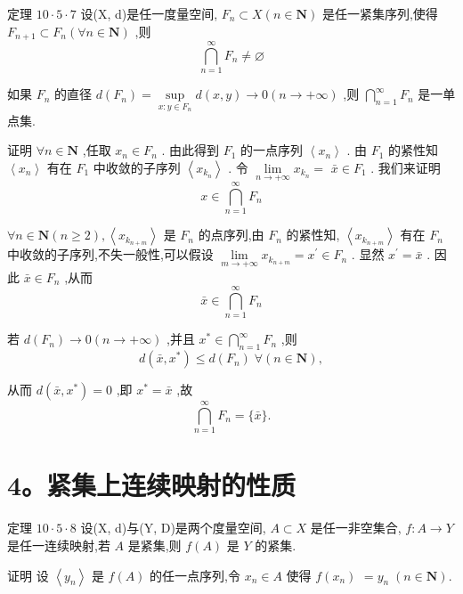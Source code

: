 定理 ${10} \cdot  5 \cdot  7$ 设(X, d)是任一度量空间, ${F}_{n} \subset  X\left( {n \in  \mathbf{N}}\right)$ 是任一紧集序列,使得 ${F}_{n + 1} \subset  {F}_{n}\left( {\forall n \in  \mathbf{N}}\right)$ ,则
$$\mathop{\bigcap }\limits_{{n = 1}}^{\infty }{F}_{n} \neq  \varnothing$$

如果 ${F}_{n}$ 的直径 $d\left( {F}_{n}\right)  = \mathop{\sup }\limits_{{x : y \in  {F}_{n}}}d\left( {x,y}\right)  \rightarrow  0\left( {n \rightarrow   + \infty }\right)$ ,则 $\mathop{\bigcap }\limits_{{n = 1}}^{\infty }{F}_{n}$ 是一单点集.

证明 $\forall n \in  \mathbf{N}$ ,任取 ${x}_{n} \in  {F}_{n}$ . 由此得到 ${F}_{1}$ 的一点序列 $\left\langle  {x}_{n}\right\rangle$ . 由 ${F}_{1}$ 的紧性知 $\left\langle  {x}_{n}\right\rangle$ 有在 ${F}_{1}$ 中收敛的子序列 $\left\langle  {x}_{{k}_{n}}\right\rangle$ . 令 $\mathop{\lim }\limits_{{n \rightarrow   + \infty }}{x}_{{k}_{n}} =$  $\bar{x} \in  {F}_{1}$ . 我们来证明
$$x \in  \mathop{\bigcap }\limits_{{n = 1}}^{\infty }{F}_{n}$$

$\forall n \in  \mathbf{N}\left( {n \geq  2}\right) ,\left\langle  {x}_{{k}_{n + m}}\right\rangle$ 是 ${F}_{n}$ 的点序列,由 ${F}_{n}$ 的紧性知, $\left\langle  {x}_{{k}_{n + m}}\right\rangle$ 有在 ${F}_{n}$ 中收敛的子序列,不失一般性,可以假设 $\mathop{\lim }\limits_{{m \rightarrow   + \infty }}{x}_{{k}_{n + m}} = {x}^{\prime } \in  {F}_{n}$ . 显然 ${x}^{\prime } = \bar{x}$ . 因此 $\bar{x} \in  {F}_{n}$ ,从而
$$\bar{x} \in  \mathop{\bigcap }\limits_{{n = 1}}^{\infty }{F}_{n}$$

若 $d\left( {F}_{n}\right)  \rightarrow  0\left( {n \rightarrow   + \infty }\right)$ ,并且 ${x}^{ * } \in  \mathop{\bigcap }\limits_{{n = 1}}^{\infty }{F}_{n}$ ,则
$$d\left( {\bar{x},{x}^{ * }}\right)  \leq  d\left( {F}_{n}\right) \;\forall \left( {n \in  \mathbf{N}}\right) ,$$

从而 $d\left( {\bar{x},{x}^{ * }}\right)  = 0$ ,即 ${x}^{ * } = \bar{x}$ ,故
$$\mathop{\bigcap }\limits_{{n = 1}}^{\infty }{F}_{n} = \{ \bar{x}\} .$$

\section*{4。紧集上连续映射的性质}

定理 ${10} \cdot  5 \cdot  8$ 设(X, d)与(Y, D)是两个度量空间, $A \subset  X$ 是任一非空集合, $f : A \rightarrow  Y$ 是任一连续映射,若 $A$ 是紧集,则 $f\left( A\right)$ 是 $Y$ 的紧集.

证明 设 $\left\langle  {y}_{n}\right\rangle$ 是 $f\left( A\right)$ 的任一点序列,令 ${x}_{n} \in  A$ 使得 $f\left( {x}_{n}\right)$  $= {y}_{n}\;\left( {n \in  \mathbf{N}}\right) .$

